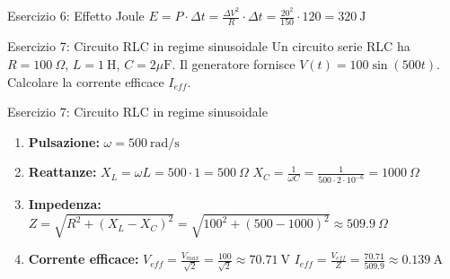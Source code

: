 \documentclass[a4paper]{article}
\begin{document}
\begin{snippetsolution}{Esercizio 6: Effetto Joule}
    \(E = P \cdot \Delta t = \frac{\Delta V^{2}}{R} \cdot \Delta t = \frac{20^{2}}{150} \cdot 120 = 320~\mathrm{J}\)
\end{snippetsolution}
\begin{snippetexercise}{Esercizio 7: Circuito RLC in regime sinusoidale}
    Un circuito serie RLC ha \(R=100~\Omega\), \(L=1~\mathrm{H}\), \(C=2\mu \mathrm{F}\). Il generatore fornisce \(V(t) = 100 \sin(500t)\). Calcolare la corrente efficace \(I_{eff}\).
\end{snippetexercise}
\begin{snippetsolution}{Esercizio 7: Circuito RLC in regime sinusoidale}
    \begin{enumerate}[nosep]
        \item \textbf{Pulsazione:} \(\omega = 500~\mathrm{rad/s}\)
        \item \textbf{Reattanze:}
        \(X_{L} = \omega L = 500 \cdot 1 = 500~\Omega\)
        \(X_{C} = \frac{1}{\omega C} = \frac{1}{500 \cdot 2 \cdot 10^{-6}} = 1000~\Omega\)
        \item \textbf{Impedenza:}
        \(Z = \sqrt{R^{2} + (X_{L} - X_{C})^{2}} = \sqrt{100^{2} + (500 - 1000)^{2}} \approx 509.9~\Omega\)
        \item \textbf{Corrente efficace:}
        \(V_{eff} = \frac{V_{max}}{\sqrt{2}} = \frac{100}{\sqrt{2}} \approx 70.71~\mathrm{V}\)
        \(I_{eff} = \frac{V_{eff}}{Z} = \frac{70.71}{509.9} \approx 0.139~\mathrm{A}\)
    \end{enumerate}
\end{snippetsolution}
\end{document}
